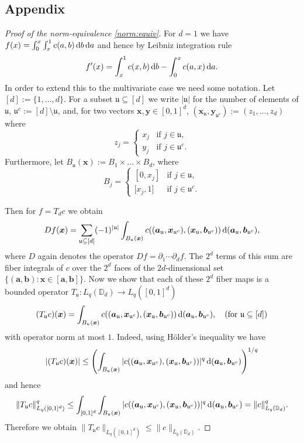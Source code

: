 \documentclass[12pt]{article}
\theoremstyle{remark}
\theoremstyle{definition}
\newcommand{\D}{\mathbb{D}}
\newcommand{\rd}{\,{\rm d}}
\newcommand{\bsx}{{\boldsymbol x}}
\newcommand{\bsy}{{\boldsymbol y}}
\newcommand{\bsa}{{\boldsymbol a}}
\newcommand{\bsb}{{\boldsymbol b}}
\newcommand{\uu}{\mathfrak{u}}
\newcommand{\<}{\langle}
\renewcommand{\>}{\rangle}
\begin{document}
\begin{appendix}
\section{Appendix}\label{sec:appA}


\begin{proof}[Proof of the norm-equivalence \eqref{norm:equiv}]
For $d=1$ we have $f(x)=\int_0^x \int_x^1 c(a,b) \rd b \rd a$ and hence by Leibniz integration rule $$f'(x)=\int_x^1 c(x,b) \rd b - \int_0^x c(a,x) \rd a.$$ In order to extend this to the multivariate case we need some notation. Let $[d]:=\{1,\ldots,d\}$. For a subset $\uu \subseteq [d]$ we write $|\uu|$ for the number of elements of $\uu$, $\uu^c:=[d]\setminus \uu$, and, for two vectors $\bsx,\bsy \in [0,1]^d$, $(\bsx_\uu,\bsy_{\uu^c}):=(z_1,\ldots,z_d)$ where 
$$z_j=\left\{ 
\begin{array}{ll}
x_j & \mbox{if } j \in \uu,\\
y_j & \mbox{if } j \in \uu^c.
\end{array}\right.$$
Furthermore, let $B_{\uu}(\bsx):= B_1 \times \ldots \times B_d$, where 
$$B_j=\left\{ 
\begin{array}{ll}
[0,x_j] & \mbox{if } j \in \uu,\\
{[}x_j,1]  & \mbox{if } j \in \uu^c.
\end{array}\right.$$

Then for $f=T_d c$ we obtain  
\begin{equation}\label{sum:Df}
D f(\bsx)=\sum_{\uu \subseteq [d]} (-1)^{|\uu|} \int_{B_{\uu}(\bsx)} c((\bsa_{\uu},\bsx_{\uu^c}),(\bsx_{\uu},\bsb_{\uu^c})) \rd (\bsa_{\uu},\bsb_{\uu^c}),
\end{equation}
where $D$ again denotes the operator $D f=\partial_1\cdots\partial_d f$. The $2^d$ terms of this sum are fiber integrals of $c$ over the $2^d$ faces of the $2d$-dimensional set $\{(\bsa,\bsb) : \bsx \in [\bsa,\bsb]\}$. Now we show that each of these $2^d$ fiber maps is a bounded operator $T_{\uu}: L_q(\D_d) \rightarrow L_q([0,1]^d)$ $$(T_{\uu} c)(\bsx)=\int_{B_{\uu}(\bsx)} c((\bsa_{\uu},\bsx_{\uu^c}),(\bsx_{\uu},\bsb_{\uu^c})) \rd (\bsa_{\uu},\bsb_{\uu^c}),\quad (\mbox{for }\uu \subseteq [d])$$ with operator norm at most $1$. Indeed, using H\"older's inequality we have
$$|(T_{\uu}c)(\bsx)| \le \left(\int_{B_{\uu}(\bsx)} | c((\bsa_{\uu},\bsx_{\uu^c}),(\bsx_{\uu},\bsb_{\uu^c}))|^q \rd (\bsa_{\uu},\bsb_{\uu^c})\right)^{1/q}$$ and hence
$$\|T_{\uu} c\|_{L_q([0,1]^d)}^q \le \int_{[0,1]^d} \int_{B_{\uu}(\bsx)} | c((\bsa_{\uu},\bsx_{\uu^c}),(\bsx_{\uu},\bsb_{\uu^c}))|^q \rd (\bsa_{\uu},\bsb_{\uu^c}) =\|c\|_{L_q(\D_d)}^q.$$
Therefore we obtain  $\|T_{\uu} c\|_{L_q([0,1]^d)} \le \|c\|_{L_q(\D_d)}$.


\end{proof}
\end{appendix}
\end{document}
